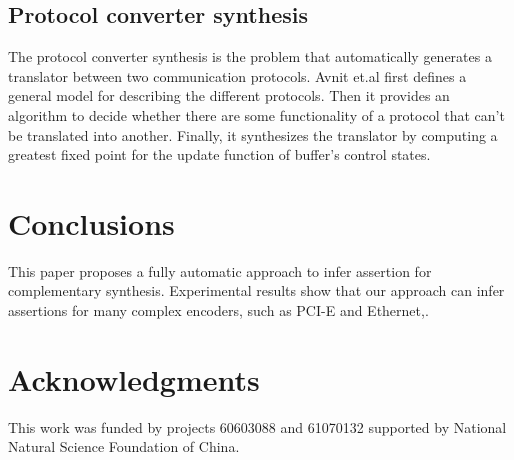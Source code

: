 \documentclass{acm_proc_article-sp}
\begin{document}
\subsection{Protocol converter synthesis}
The protocol converter synthesis is the problem that automatically generates a translator between two communication protocols.
Avnit et.al \cite{converter_date08} first defines a general model for describing the different protocols.
Then it provides an algorithm to decide
whether there are some functionality of a protocol that can't be translated into another.
Finally,
it synthesizes the translator by computing a greatest fixed point for the update function of buffer's control states.

\section{Conclusions}\label{sec_conclude}

This paper proposes a fully automatic approach to infer assertion for complementary synthesis.
Experimental results show that our approach can infer assertions for many complex encoders,
such as PCI-E\cite{PCIESPEC} and Ethernet\cite{IEEE80232002},.



\section{Acknowledgments}
This work was funded by projects 60603088 and 61070132 supported by National Natural Science Foundation of China.


%

%
%
\end{document}
